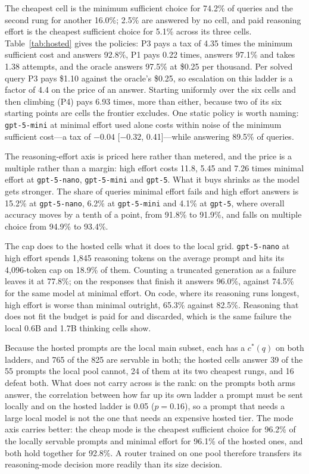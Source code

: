 \documentclass[final,5p,times,twocolumn]{elsarticle}
\theoremstyle{plain}
\newcommand{\cstar}{c^{*}}
\begin{document}
The cheapest cell is the minimum sufficient choice for 74.2\% of queries and
the second rung for another 16.0\%; 2.5\% are answered by no cell, and paid
reasoning effort is the cheapest sufficient choice for 5.1\% across its three
cells. Table~\ref{tab:hosted} gives the policies: P3 pays a tax of 4.35 times
the minimum sufficient cost and answers 92.8\%, P1 pays 0.22 times, answers
97.1\% and takes 1.38 attempts, and the oracle answers 97.5\% at \$0.25 per
thousand. Per solved query P3 pays \$1.10 against the oracle's \$0.25, so
escalation on this ladder is a factor of 4.4 on the price of an answer.
Starting uniformly over the six cells and then climbing (P4) pays 6.93 times,
more than either, because two of its six starting points are cells the
frontier excludes. One static policy is worth naming: \texttt{gpt-5-mini} at
minimal effort used alone costs within noise of the minimum sufficient
cost---a tax of $-0.04$ [$-0.32$, 0.41]---while answering 89.5\% of queries.

The reasoning-effort axis is priced here rather than metered, and the price
is a multiple rather than a margin: high effort costs 11.8, 5.45 and 7.26
times minimal effort at \texttt{gpt-5-nano}, \texttt{gpt-5-mini} and
\texttt{gpt-5}. What it buys shrinks as the model gets stronger. The share of
queries minimal effort fails and high effort answers is 15.2\% at
\texttt{gpt-5-nano}, 6.2\% at \texttt{gpt-5-mini} and 4.1\% at
\texttt{gpt-5}, where overall accuracy moves by a tenth of a point, from
91.8\% to 91.9\%, and falls on multiple choice from 94.9\% to 93.4\%.

The cap does to the hosted cells what it does to the local grid.
\texttt{gpt-5-nano} at high effort spends 1{,}845 reasoning tokens on the
average prompt and hits its 4{,}096-token cap on 18.9\% of them. Counting a
truncated generation as a failure leaves it at 77.8\%; on the responses that
finish it answers 96.0\%, against 74.5\% for the same model at minimal
effort. On code, where its reasoning runs longest, high effort is worse than
minimal outright, 65.3\% against 82.5\%. Reasoning that does not fit the
budget is paid for and discarded, which is the same failure the local 0.6B
and 1.7B thinking cells show.

Because the hosted prompts are the local main subset, each has a $\cstar(q)$
on both ladders, and 765 of the 825 are servable in both; the hosted cells
answer 39 of the 55 prompts the local pool cannot, 24 of them at its two
cheapest rungs, and 16 defeat both. What does not carry across is the rank:
on the prompts both arms answer, the correlation between how far up its own
ladder a prompt must be sent locally and on the hosted ladder is 0.05
($p = 0.16$), so a prompt that needs a large local model is not the one that
needs an expensive hosted tier. The mode axis carries better: the cheap mode
is the cheapest sufficient choice for 96.2\% of the locally servable prompts
and minimal effort for 96.1\% of the hosted ones, and both hold together for
92.8\%. A router trained on one pool therefore transfers its reasoning-mode
decision more readily than its size decision.
\end{document}

